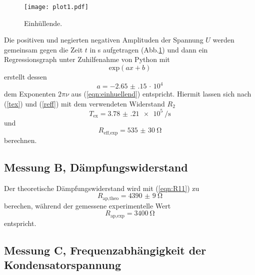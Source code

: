 \begin{figure}
  \centering
  \texttt{[image: plot1.pdf]}
  \caption{Einhüllende.}
  \label{fig:plot1}
\end{figure}
 Die positiven und negierten negativen Amplituden der Spannung $U$ werden gemeinsam
gegen die Zeit $t$ in s aufgetragen (Abb.\ref{fig:plot1}) und dann ein Regressionsgraph
unter Zuhilfenahme von Python mit
\begin{equation*}
  \text{exp}(ax+b)
\end{equation*}
erstellt dessen
\begin{equation*}
   a = \num{-2.65(15)}\, \cdot\, 10^{4}
\end{equation*}
dem Exponenten $2\pi\nu$ aus (\ref{eqn:einhuellend}) entspricht.
Hiermit lassen sich nach (\ref{tex}) und (\ref{reff}) mit dem verwendeten Widerstand $R_{\text{2}}$
\begin{equation*}
   T_{\text{ex}} = \SI{3.78(21)e5}{\per\second}
\end{equation*}
und
\begin{equation*}
R_{\text{eff,exp}} = \SI{535(30)}{\ohm}
\end{equation*}
berechnen.



\subsection{Messung B, Dämpfungswiderstand}
Der theoretische Dämpfungswiderstand wird mit (\ref{eqn:R11}) zu
\begin{equation*}
  R_{\text{ap,theo}} = \SI{4390(9)}{\ohm}
\end{equation*}
  berechen, während der gemessene experimentelle Wert
\begin{equation*}
  R_{\text{ap,exp}} = \SI{3400}{\ohm}
\end{equation*}
entspricht.

\subsection{Messung C, Frequenzabhängigkeit der Kondensatorspannung}

